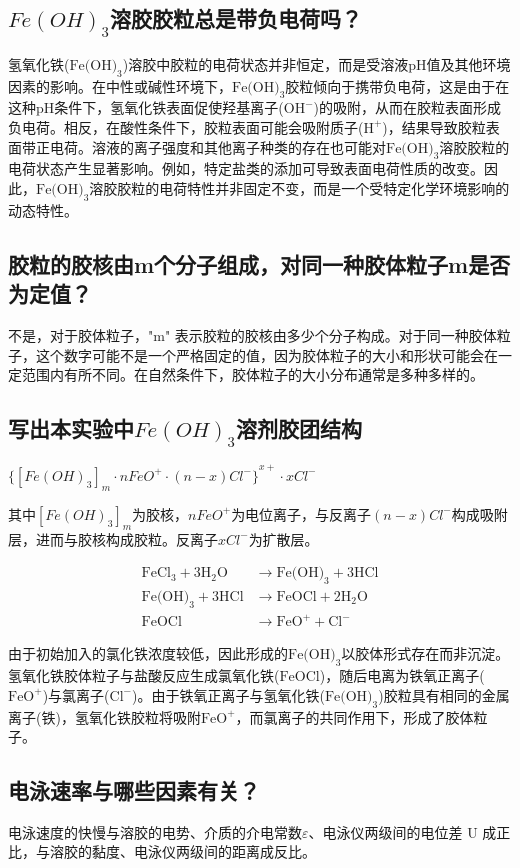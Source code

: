 \documentclass[12pt,hyperref,a4paper,UTF8]{ctexart}
\begin{document}
\subsection{$Fe(OH)_3$溶胶胶粒总是带负电荷吗？}
氢氧化铁($\text{Fe(OH)}_3$)溶胶中胶粒的电荷状态并非恒定，而是受溶液pH值及其他环境因素的影响。在中性或碱性环境下，$\text{Fe(OH)}_3$胶粒倾向于携带负电荷，这是由于在这种pH条件下，氢氧化铁表面促使羟基离子($\text{OH}^-$)的吸附，从而在胶粒表面形成负电荷。相反，在酸性条件下，胶粒表面可能会吸附质子($\text{H}^+$)，结果导致胶粒表面带正电荷。溶液的离子强度和其他离子种类的存在也可能对$\text{Fe(OH)}_3$溶胶胶粒的电荷状态产生显著影响。例如，特定盐类的添加可导致表面电荷性质的改变。因此，$\text{Fe(OH)}_3$溶胶胶粒的电荷特性并非固定不变，而是一个受特定化学环境影响的动态特性。
\subsection{胶粒的胶核由m个分子组成，对同一种胶体粒子m是否为定值？}


    不是，对于胶体粒子，"m" 表示胶粒的胶核由多少个分子构成。对于同一种胶体粒子，这个数字可能不是一个严格固定的值，因为胶体粒子的大小和形状可能会在一定范围内有所不同。在自然条件下，胶体粒子的大小分布通常是多种多样的。
\subsection{写出本实验中$Fe(OH)_3$溶剂胶团结构}

    ${\{ [Fe(OH)_3]_m \cdot nFeO^{+} \cdot (n-x)Cl^{-} \} }^{x+} \cdot xCl^{-}$

    其中$[Fe(OH)_3]_m$为胶核，$nFeO^{+}$为电位离子，与反离子$(n-x)Cl^{-}$构成吸附层，进而与胶核构成胶粒。反离子$xCl^{-}$为扩散层。

\begin{align}
	\text{FeCl}_3 + 3\text{H}_2\text{O} &\rightarrow \text{Fe(OH)}_3 + 3\text{HCl} \\
	\text{Fe(OH)}_3 + 3\text{HCl} &\rightarrow \text{FeOCl} + 2\text{H}_2\text{O} \\
	\text{FeOCl} &\rightarrow \text{FeO}^+ + \text{Cl}^-
\end{align}

由于初始加入的氯化铁浓度较低，因此形成的$\text{Fe(OH)}_3$以胶体形式存在而非沉淀。氢氧化铁胶体粒子与盐酸反应生成氯氧化铁($\text{FeOCl}$)，随后电离为铁氧正离子($\text{FeO}^+$)与氯离子($\text{Cl}^-$)。由于铁氧正离子与氢氧化铁($\text{Fe(OH)}_3$)胶粒具有相同的金属离子(铁)，氢氧化铁胶粒将吸附$\text{FeO}^+$，而氯离子的共同作用下，形成了胶体粒子。

\subsection{电泳速率与哪些因素有关？}
电泳速度的快慢与溶胶的电势、介质的介电常数$\varepsilon$、电泳仪两级间的电位差 U 成正比，与溶胶的黏度、电泳仪两级间的距离成反比。




\end{document}
